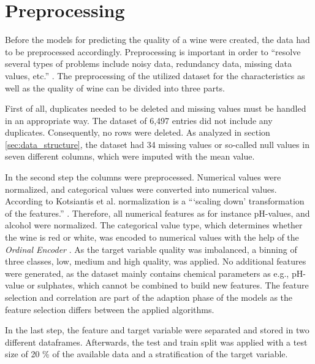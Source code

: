 \section{Preprocessing}\label{chap:preprocessing}
Before the models for predicting the quality of a wine were created, the data had to be preprocessed accordingly. Preprocessing is important in order to \enquote{resolve several types of problems include noisy data, redundancy data, missing data values, etc.} \citep[p. 116]{Kotsiantis2006}. The preprocessing of the utilized dataset for the characteristics as well as the quality of wine can be divided into three parts.

First of all, duplicates needed to be deleted and missing values must be handled in an appropriate way. The dataset of 6,497 entries did not include any duplicates. Consequently, no rows were deleted. As analyzed in section \ref{sec:data_structure}, the dataset had 34 missing values or so-called null values in seven different columns, which were imputed with the mean value.

In the second step the columns were preprocessed. Numerical values were normalized, and categorical values were converted into numerical values. According to Kotsiantis et al. normalization is a \enquote{\enquote{scaling down} transformation of the features.} \citep[p. 113]{Kotsiantis2006}. Therefore, all numerical features as for instance pH-values, and alcohol were normalized. The categorical value type, which determines whether the wine is red or white, was encoded to numerical values with the help of the \textit{Ordinal Encoder} \citep{OrdinalEncoder2021}. As the target variable quality was imbalanced, a binning of three classes, low, medium and high quality, was applied. No additional features were generated, as the dataset mainly contains chemical parameters as e.g., pH-value or sulphates, which cannot be combined to build new features. The feature selection and correlation are part of the adaption phase of the models as the feature selection differs between the applied algorithms.

In the last step, the feature and target variable were separated and stored in two different dataframes. Afterwards, the test and train split was applied with a test size of 20 \% of the available data and a stratification of the target variable. 



